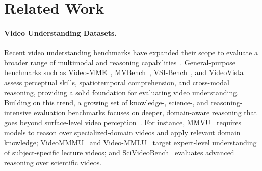 
\section{Related Work}

\paragraph{Video Understanding Datasets.}
Recent video understanding benchmarks have expanded their scope to evaluate a broader range of multimodal and reasoning capabilities~\cite{Wu2024STARAB, Zhou2024MLVUBM, videmme, mmvu, scivideobench, li2024videovistaversatilebenchmarkvideo, liu2026videoreasonbenchmllmsperformvisioncentric, xu2025expvidbenchmarkexperimentvideo}.
General-purpose benchmarks such as Video-MME~\cite{videmme}, MVBench~\cite{mvbench}, VSI-Bench~\cite{vsibench}, and VideoVista~\cite{li2024videovistaversatilebenchmarkvideo} assess perceptual skills, spatiotemporal comprehension, and cross-modal reasoning, providing a solid foundation for evaluating video understanding.
Building on this trend, a growing set of knowledge-, science-, and reasoning-intensive evaluation benchmarks focuses on deeper, domain-aware reasoning that goes beyond surface-level video perception~\cite{xu2025expvidbenchmarkexperimentvideo, liu2026videoreasonbenchmllmsperformvisioncentric}.
For instance, MMVU~\cite{mmvu} requires models to reason over specialized-domain videos and apply relevant domain knowledge; VideoMMMU~\cite{videommmu} and Video-MMLU~\cite{song2025video} target expert-level understanding of subject-specific lecture videos; and SciVideoBench~\cite{scivideobench} evaluates advanced reasoning over scientific videos.


